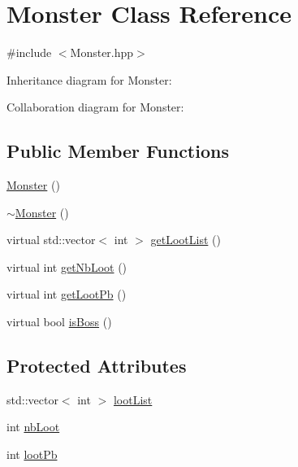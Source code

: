 \hypertarget{classMonster}{\section{Monster Class Reference}
\label{classMonster}
}


{\ttfamily \#include $<$Monster.\-hpp$>$}



Inheritance diagram for Monster\-:


Collaboration diagram for Monster\-:
\subsection*{Public Member Functions}
\begin{DoxyCompactItemize}
\item 
\hyperlink{classMonster_a3dfc253fbec8331d42ac13c20bf9425f}{Monster} ()
\item 
\hyperlink{classMonster_a21619ba1759b910cd2fd50d858aab338}{$\sim$\-Monster} ()
\item 
virtual std\-::vector$<$ int $>$ \hyperlink{classMonster_a554568d85f2b3eb79e137627c0f6f34c}{get\-Loot\-List} ()
\item 
virtual int \hyperlink{classMonster_af3b2c25795a9670f720f7f42df420425}{get\-Nb\-Loot} ()
\item 
virtual int \hyperlink{classMonster_a33e599356a6262960088c025d6de2602}{get\-Loot\-Pb} ()
\item 
virtual bool \hyperlink{classMonster_a478bac2f3aa6117aac9b813fc14226e6}{is\-Boss} ()
\end{DoxyCompactItemize}
\subsection*{Protected Attributes}
\begin{DoxyCompactItemize}
\item 
std\-::vector$<$ int $>$ \hyperlink{classMonster_ab8b7e80d5929a26ef83d409b557ba1c2}{loot\-List}
\item 
int \hyperlink{classMonster_a4fad5b269c9e61070b7ab149edd7ec0d}{nb\-Loot}
\item 
int \hyperlink{classMonster_ac9e9bbb454b38bafdd0a252714708d02}{loot\-Pb}
\end{DoxyCompactItemize}



